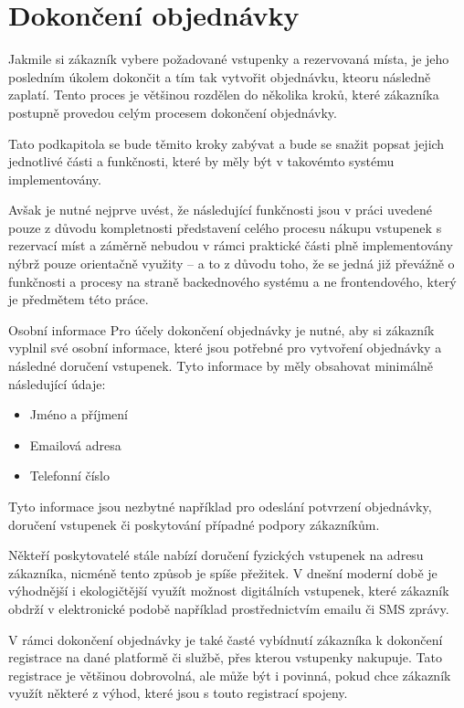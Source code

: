 \section{Dokončení objednávky}
\label{sec:identifikace-dokonceni-objednavky}
Jakmile si zákazník vybere požadované vstupenky a rezervovaná místa, je jeho posledním úkolem dokončit a tím tak vytvořit objednávku, kteoru následně zaplatí.
Tento proces je většinou rozdělen do několika kroků, které zákazníka postupně provedou celým procesem dokončení objednávky.

Tato podkapitola se bude těmito kroky zabývat a bude se snažit popsat jejich jednotlivé části a funkčnosti, které by měly být v takovémto systému implementovány.

Avšak je nutné nejprve uvést, že následující funkčnosti jsou v práci uvedené pouze z důvodu kompletnosti představení celého procesu nákupu vstupenek s rezervací míst a záměrně nebudou v rámci praktické části plně implementovány nýbrž pouze orientačně využity – a to z důvodu toho, že se jedná již převážně o funkčnosti a procesy na straně backednového systému a ne frontendového, který je předmětem této práce.

\begin{subsection}{Osobní informace}
    \label{subsec:identifikace-dokonceni-objednavky-osobni-informace}
    Pro účely dokončení objednávky je nutné, aby si zákazník vyplnil své osobní informace, které jsou potřebné pro vytvoření objednávky a následné doručení vstupenek.
    Tyto informace by měly obsahovat minimálně následující údaje:

    \begin{itemize}
        \item Jméno a příjmení
        \item Emailová adresa
        \item Telefonní číslo
    \end{itemize}

    Tyto informace jsou nezbytné například pro odeslání potvrzení objednávky, doručení vstupenek či poskytování případné podpory zákazníkům.

    Někteří poskytovatelé stále nabízí doručení fyzických vstupenek na adresu zákazníka, nicméně tento způsob je spíše přežitek.
    V dnešní moderní době je výhodnější i ekologičtější využít možnost digitálních vstupenek, které zákazník obdrží v elektronické podobě například prostřednictvím emailu či SMS zprávy.

    V rámci dokončení objednávky je také časté vybídnutí zákazníka k dokončení registrace na dané platformě či službě, přes kterou vstupenky nakupuje.
    Tato registrace je většinou dobrovolná, ale může být i povinná, pokud chce zákazník využít některé z výhod, které jsou s touto registrací spojeny.
\end{subsection}


